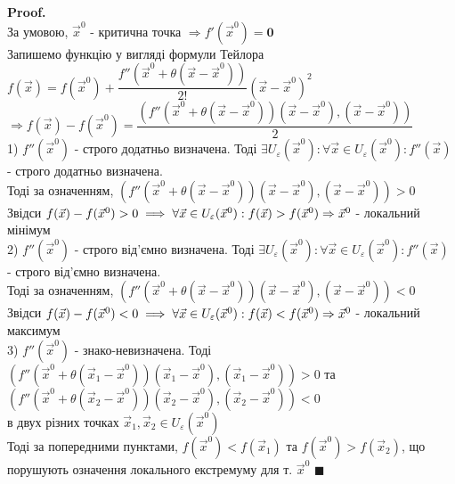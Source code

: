 \documentclass[a4paper, 14pt]{extarticle}
\def\bigline{\vspace{5mm}\\}
\theoremstyle{theoremdd}
\theoremstyle{theoremdd}
\theoremstyle{theoremdd}
\theoremstyle{theoremdd}
\theoremstyle{theoremdd}
\theoremstyle{theoremdd}
\theoremstyle{theoremdd}
\newenvironment{pf}{\vspace*{-3mm} \textbf{Proof. \\}}{$\blacksquare$}
\begin{document}
\begin{pf}
За умовою, $\vec{x}^0$ - критична точка $\Rightarrow f'(\vec{x}^0) = \textbf{0}$\\
Запишемо функцію у вигляді формули Тейлора\\
$f(\vec{x}) = f(\vec{x}^0) + \dfrac{f''(\vec{x}^0+\theta(\vec{x}-\vec{x}^0))}{2!}(\vec{x}-\vec{x}^0)^2$\\
$\Rightarrow f(\vec{x}) - f(\vec{x}^0) = \dfrac{(f''(\vec{x}^0 + \theta(\vec{x}-\vec{x}^0))(\vec{x}-\vec{x}^0), (\vec{x}-\vec{x}^0))}{2}$\\
1) $f''(\vec{x}^0)$ - строго додатньо визначена. Тоді $\exists U_{\varepsilon}(\vec{x}^0): \forall \vec{x} \in U_{\varepsilon}(\vec{x}^0): f''(\vec{x})$ - строго додатньо визначена. \\ Тоді за означенням, $(f''(\vec{x}^0 + \theta(\vec{x}-\vec{x}^0))(\vec{x}-\vec{x}^0), (\vec{x}-\vec{x}^0)) > 0$\\
Звідси $f(\vec{x})-f(\vec{x}^0) > 0 \implies \forall \vec{x} \in U_{\varepsilon}(\vec{x}^0): f(\vec{x}) > f(\vec{x}^0) \\ \Rightarrow \vec{x}^0$ - локальний мінімум
\bigline
2) $f''(\vec{x}^0)$ - строго від'ємно визначена. Тоді $\exists U_{\varepsilon}(\vec{x}^0): \forall \vec{x} \in U_{\varepsilon}(\vec{x}^0): f''(\vec{x})$ - строго від'ємно визначена. \\ Тоді за означенням, $(f''(\vec{x}^0 + \theta(\vec{x}-\vec{x}^0))(\vec{x}-\vec{x}^0), (\vec{x}-\vec{x}^0)) < 0$\\
Звідси $f(\vec{x})-f(\vec{x}^0) < 0 \implies \forall \vec{x} \in U_{\varepsilon}(\vec{x}^0): f(\vec{x}) < f(\vec{x}^0) \\ \Rightarrow \vec{x}^0$ - локальний максимум
\bigline
3) $f''(\vec{x}^0)$ - знако-невизначена. Тоді \\ $(f''(\vec{x}^0 + \theta(\vec{x}_1-\vec{x}^0))(\vec{x}_1-\vec{x}^0), (\vec{x}_1-\vec{x}^0)) > 0$ та \\ $(f''(\vec{x}^0 + \theta(\vec{x}_2-\vec{x}^0))(\vec{x}_2-\vec{x}^0), (\vec{x}_2-\vec{x}^0)) < 0$ \\ в двух різних точках $\vec{x}_1,\vec{x}_2 \in U_{\varepsilon}(\vec{x}^0)$\\
Тоді за попередними пунктами, $f(\vec{x}^0) < f(\vec{x}_1)$ та $f(\vec{x}^0) > f(\vec{x}_2)$, що порушують означення локального екстремуму для т. $\vec{x}^0$
\end{pf}
\end{document}
